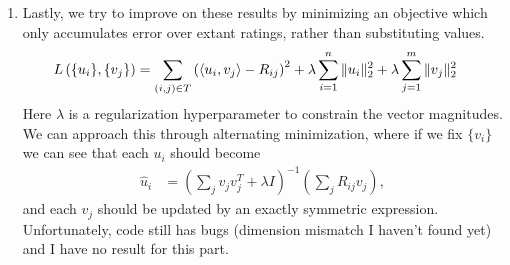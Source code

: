 \documentclass[11pt,letterpaper]{article}
\theoremstyle{definition}
\theoremstyle{plain}
\numberwithin{equation}{section}
\numberwithin{figure}{section}
\begin{document}
\begin{enumerate}
\begin{enumerate}
		\item Lastly, we try to improve on these results by minimizing an objective which only accumulates error over extant ratings, rather than substituting values.
		\begin{align*}
			L\left(\{u_i\},\{v_j\}\right) &= \sum_{(i,j)\in T} \left(\braket{u_i,v_j} - R_{ij}\right)^2 + \lambda \sum_{i=1}^n \|u_i\|_2^2 + \lambda \sum_{j=1}^m \|v_j\|_2^2
		\end{align*}
		Here $\lambda$ is a regularization hyperparameter to constrain the vector magnitudes. We can approach this through alternating minimization, where if we fix $\{v_i\}$ we can see that each $u_i$ should become
		\begin{align*}
			\hat{u}_i &= \left(\sum_j v_j v_j^T + \lambda I\right)^{-1} \left(\sum_j R_{ij} v_j\right),
		\end{align*}
		and each $v_j$ should be updated by an exactly symmetric expression. Unfortunately, code still has bugs (dimension mismatch I haven't found yet) and I have no result for this part.
	\end{enumerate}
\end{enumerate}













\clearpage

\end{document}
